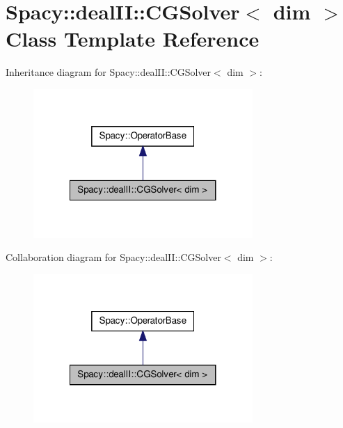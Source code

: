 \hypertarget{classSpacy_1_1dealII_1_1CGSolver}{\section{\-Spacy\-:\-:deal\-I\-I\-:\-:\-C\-G\-Solver$<$ dim $>$ \-Class \-Template \-Reference}
\label{classSpacy_1_1dealII_1_1CGSolver}
}


\-Inheritance diagram for \-Spacy\-:\-:deal\-I\-I\-:\-:\-C\-G\-Solver$<$ dim $>$\-:
\nopagebreak
\begin{figure}[H]
\begin{center}
\leavevmode
\includegraphics[width=236pt]{classSpacy_1_1dealII_1_1CGSolver__inherit__graph}
\end{center}
\end{figure}


\-Collaboration diagram for \-Spacy\-:\-:deal\-I\-I\-:\-:\-C\-G\-Solver$<$ dim $>$\-:
\nopagebreak
\begin{figure}[H]
\begin{center}
\leavevmode
\includegraphics[width=236pt]{classSpacy_1_1dealII_1_1CGSolver__coll__graph}
\end{center}
\end{figure}
